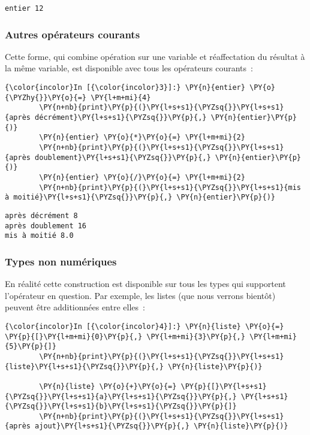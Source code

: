     \begin{Verbatim}[commandchars=\\\{\}]
entier 12

    \end{Verbatim}

    \hypertarget{autres-opuxe9rateurs-courants}{%
\subsubsection{Autres opérateurs
courants}\label{autres-opuxe9rateurs-courants}}

    Cette forme, qui combine opération sur une variable et réaffectation du
résultat à la même variable, est disponible avec tous les opérateurs
courants~:

    \begin{Verbatim}[commandchars=\\\{\}]
{\color{incolor}In [{\color{incolor}3}]:} \PY{n}{entier} \PY{o}{\PYZhy{}}\PY{o}{=} \PY{l+m+mi}{4}
        \PY{n+nb}{print}\PY{p}{(}\PY{l+s+s1}{\PYZsq{}}\PY{l+s+s1}{après décrément}\PY{l+s+s1}{\PYZsq{}}\PY{p}{,} \PY{n}{entier}\PY{p}{)}
        \PY{n}{entier} \PY{o}{*}\PY{o}{=} \PY{l+m+mi}{2}
        \PY{n+nb}{print}\PY{p}{(}\PY{l+s+s1}{\PYZsq{}}\PY{l+s+s1}{après doublement}\PY{l+s+s1}{\PYZsq{}}\PY{p}{,} \PY{n}{entier}\PY{p}{)}
        \PY{n}{entier} \PY{o}{/}\PY{o}{=} \PY{l+m+mi}{2}
        \PY{n+nb}{print}\PY{p}{(}\PY{l+s+s1}{\PYZsq{}}\PY{l+s+s1}{mis à moitié}\PY{l+s+s1}{\PYZsq{}}\PY{p}{,} \PY{n}{entier}\PY{p}{)}
\end{Verbatim}


    \begin{Verbatim}[commandchars=\\\{\}]
après décrément 8
après doublement 16
mis à moitié 8.0

    \end{Verbatim}

    \hypertarget{types-non-numuxe9riques}{%
\subsubsection{Types non numériques}\label{types-non-numuxe9riques}}

    En réalité cette construction est disponible sur tous les types qui
supportent l'opérateur en question. Par exemple, les listes (que nous
verrons bientôt) peuvent être additionnées entre elles~:

    \begin{Verbatim}[commandchars=\\\{\}]
{\color{incolor}In [{\color{incolor}4}]:} \PY{n}{liste} \PY{o}{=} \PY{p}{[}\PY{l+m+mi}{0}\PY{p}{,} \PY{l+m+mi}{3}\PY{p}{,} \PY{l+m+mi}{5}\PY{p}{]}
        \PY{n+nb}{print}\PY{p}{(}\PY{l+s+s1}{\PYZsq{}}\PY{l+s+s1}{liste}\PY{l+s+s1}{\PYZsq{}}\PY{p}{,} \PY{n}{liste}\PY{p}{)}
        
        \PY{n}{liste} \PY{o}{+}\PY{o}{=} \PY{p}{[}\PY{l+s+s1}{\PYZsq{}}\PY{l+s+s1}{a}\PY{l+s+s1}{\PYZsq{}}\PY{p}{,} \PY{l+s+s1}{\PYZsq{}}\PY{l+s+s1}{b}\PY{l+s+s1}{\PYZsq{}}\PY{p}{]}
        \PY{n+nb}{print}\PY{p}{(}\PY{l+s+s1}{\PYZsq{}}\PY{l+s+s1}{après ajout}\PY{l+s+s1}{\PYZsq{}}\PY{p}{,} \PY{n}{liste}\PY{p}{)}
\end{Verbatim}


